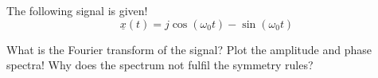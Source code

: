 \begin{solution}
\begin{tasks}
%		
	\end{tasks}
\end{solution}

\begin{question}[subtitle={Fourier Transform of Signals}]
	The following signal is given!
	\begin{equation*}
		\underline{x}(t) = j \cos\left(\omega_0 t\right) - \sin\left(\omega_0 t\right)
	\end{equation*}
	
	\begin{tasks}
		\task
		What is the Fourier transform of the signal?
		\task
		Plot the amplitude and phase spectra!
		\task
		Why does the spectrum not fulfil the symmetry rules?
	\end{tasks}
\end{question}

